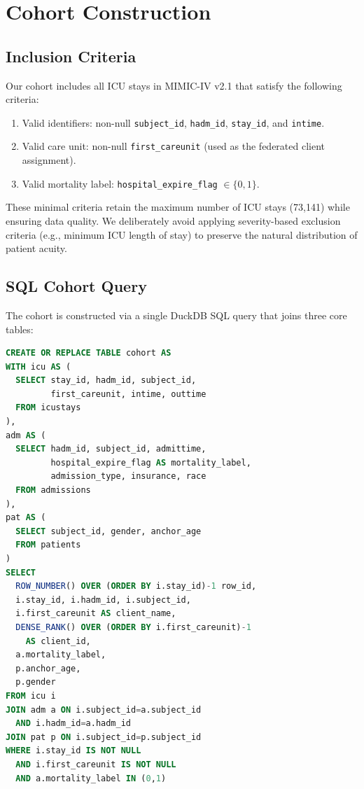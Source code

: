 \documentclass[11pt,a4paper]{report}
\begin{document}
\chapter{Cohort Construction}

\section{Inclusion Criteria}

Our cohort includes all ICU stays in MIMIC-IV v2.1 that satisfy the following criteria:
\begin{enumerate}[leftmargin=2em]
\item Valid identifiers: non-null \texttt{subject\_id}, \texttt{hadm\_id}, \texttt{stay\_id}, and \texttt{intime}.
\item Valid care unit: non-null \texttt{first\_careunit} (used as the federated client assignment).
\item Valid mortality label: \texttt{hospital\_expire\_flag} $\in \{0, 1\}$.
\end{enumerate}

These minimal criteria retain the maximum number of ICU stays (73,141) while ensuring data quality. We deliberately avoid applying severity-based exclusion criteria (e.g., minimum ICU length of stay) to preserve the natural distribution of patient acuity.

\section{SQL Cohort Query}

The cohort is constructed via a single DuckDB SQL query that joins three core tables:

\begin{lstlisting}[language=SQL,basicstyle=\small\ttfamily]
CREATE OR REPLACE TABLE cohort AS
WITH icu AS (
  SELECT stay_id, hadm_id, subject_id,
         first_careunit, intime, outtime
  FROM icustays
),
adm AS (
  SELECT hadm_id, subject_id, admittime,
         hospital_expire_flag AS mortality_label,
         admission_type, insurance, race
  FROM admissions
),
pat AS (
  SELECT subject_id, gender, anchor_age
  FROM patients
)
SELECT
  ROW_NUMBER() OVER (ORDER BY i.stay_id)-1 row_id,
  i.stay_id, i.hadm_id, i.subject_id,
  i.first_careunit AS client_name,
  DENSE_RANK() OVER (ORDER BY i.first_careunit)-1
    AS client_id,
  a.mortality_label,
  p.anchor_age,
  p.gender
FROM icu i
JOIN adm a ON i.subject_id=a.subject_id
  AND i.hadm_id=a.hadm_id
JOIN pat p ON i.subject_id=p.subject_id
WHERE i.stay_id IS NOT NULL
  AND i.first_careunit IS NOT NULL
  AND a.mortality_label IN (0,1)
\end{lstlisting}
\end{document}
